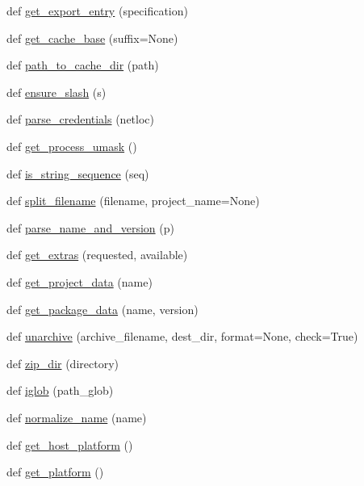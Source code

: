 \begin{DoxyCompactItemize}
\item 
def \hyperlink{namespacepip_1_1__vendor_1_1distlib_1_1util_ab08429a7d1220e90fab7c84f53fd9540}{get\+\_\+export\+\_\+entry} (specification)
\item 
def \hyperlink{namespacepip_1_1__vendor_1_1distlib_1_1util_a791b42bcb8e9cb3de6d55b0f85428d93}{get\+\_\+cache\+\_\+base} (suffix=None)
\item 
def \hyperlink{namespacepip_1_1__vendor_1_1distlib_1_1util_a27ee35211a637c728142faac900199f7}{path\+\_\+to\+\_\+cache\+\_\+dir} (path)
\item 
def \hyperlink{namespacepip_1_1__vendor_1_1distlib_1_1util_a4cd22029a8e2cbc2b4e596debb2e5a3f}{ensure\+\_\+slash} (s)
\item 
def \hyperlink{namespacepip_1_1__vendor_1_1distlib_1_1util_accb502b767f0b1560da9275ef4a7605d}{parse\+\_\+credentials} (netloc)
\item 
def \hyperlink{namespacepip_1_1__vendor_1_1distlib_1_1util_ab87a883f891fb36e2a8ef27c2b624487}{get\+\_\+process\+\_\+umask} ()
\item 
def \hyperlink{namespacepip_1_1__vendor_1_1distlib_1_1util_ac8be6fbf46affaf7a5d5481b026a8291}{is\+\_\+string\+\_\+sequence} (seq)
\item 
def \hyperlink{namespacepip_1_1__vendor_1_1distlib_1_1util_a33a17f43f88d1da4ae9065e01f87ae4a}{split\+\_\+filename} (filename, project\+\_\+name=None)
\item 
def \hyperlink{namespacepip_1_1__vendor_1_1distlib_1_1util_a790092804a63d6bd8b2c17117864b1b6}{parse\+\_\+name\+\_\+and\+\_\+version} (p)
\item 
def \hyperlink{namespacepip_1_1__vendor_1_1distlib_1_1util_a1b765315a47e7ba38c0d948480c9b0d2}{get\+\_\+extras} (requested, available)
\item 
def \hyperlink{namespacepip_1_1__vendor_1_1distlib_1_1util_a7a7bdeeed0949822f2ef611aca8c4a7b}{get\+\_\+project\+\_\+data} (name)
\item 
def \hyperlink{namespacepip_1_1__vendor_1_1distlib_1_1util_aa40738b48d620d068b6c7e1ca67b5a87}{get\+\_\+package\+\_\+data} (name, version)
\item 
def \hyperlink{namespacepip_1_1__vendor_1_1distlib_1_1util_a08221caec58461cdad6a185451123c95}{unarchive} (archive\+\_\+filename, dest\+\_\+dir, format=None, check=True)
\item 
def \hyperlink{namespacepip_1_1__vendor_1_1distlib_1_1util_ade5b92b1fce9b1301a0b7ae5b2ffd2f9}{zip\+\_\+dir} (directory)
\item 
def \hyperlink{namespacepip_1_1__vendor_1_1distlib_1_1util_a01e026ce674216cb9a30feec8d96f7cd}{iglob} (path\+\_\+glob)
\item 
def \hyperlink{namespacepip_1_1__vendor_1_1distlib_1_1util_a1c4bf3d6549dfc63734fcff5b15a76a0}{normalize\+\_\+name} (name)
\item 
def \hyperlink{namespacepip_1_1__vendor_1_1distlib_1_1util_a595b6cab0ebbee6eaaac6f3a08d03c49}{get\+\_\+host\+\_\+platform} ()
\item 
def \hyperlink{namespacepip_1_1__vendor_1_1distlib_1_1util_a0875dfce5a5b4a91a1b7aad7da918a11}{get\+\_\+platform} ()
\end{DoxyCompactItemize}
